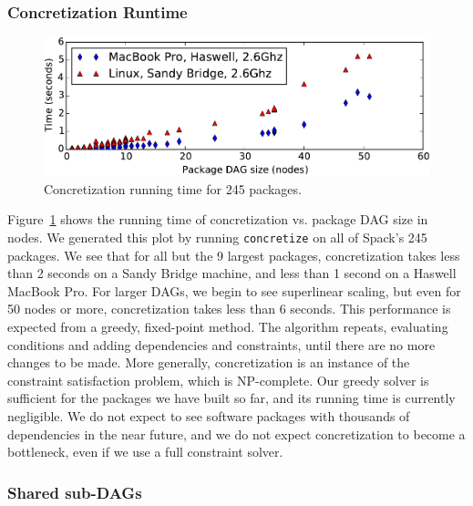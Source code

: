 \subsubsection{Concretization Runtime}
\label{sec:concretization-overhead}

\begin{figure}
	\centering
	\includegraphics[width=\columnwidth]{figs/concretization-overhead/concretization-times.pdf}
	\caption{
		Concretization running time for 245 packages.
		\label{fig:concretization-time}
	}
\end{figure}

Figure~\ref{fig:concretization-time} shows the running time of concretization vs.
package DAG size in nodes.  We generated this plot by running {\tt concretize}
on all of Spack's 245 packages.  We see that for all but the 9 largest
packages, concretization takes less than 2 seconds on a Sandy Bridge machine, 
and less than 1 second on a Haswell MacBook Pro.  For larger DAGs, we begin
to see superlinear scaling, but even for 50 nodes or more, concretization
takes less than 6 seconds.
%
This performance is expected from a greedy, fixed-point method.
The algorithm repeats, evaluating conditions and adding dependencies and constraints, until
there are no more changes to be made.
%
%
More generally, concretization is an instance of the constraint
satisfaction problem, which is NP-complete. Our greedy solver is sufficient for the
packages we have built so far, and its running time is currently negligible. We do
not expect to see software packages with thousands of dependencies in the near
future, and we do not expect concretization to become a bottleneck, even if we
use a full constraint solver.

\subsubsection{Shared sub-DAGs}
\label{sec:directory-layout}

